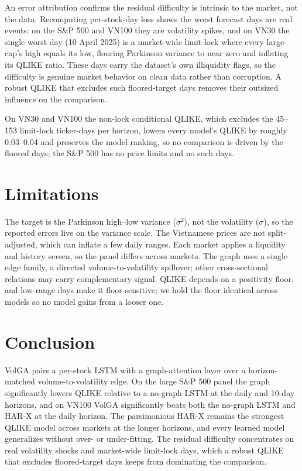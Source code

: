 \documentclass{llncs}
\begin{document}
An error attribution confirms the residual difficulty is intrinsic to the market, not the data. Recomputing
per-stock-day loss shows the worst forecast days are real events: on the S\&P 500 and VN100 they are volatility
spikes, and on VN30 the single worst day (10 April 2025) is a market-wide limit-lock where every large-cap's
high equals its low, flooring Parkinson variance to near zero and inflating its QLIKE ratio. These days carry
the dataset's own illiquidity flags, so the difficulty is genuine market behavior on clean data rather than
corruption. A robust QLIKE that excludes such floored-target days removes their outsized influence on the
comparison.


On VN30 and VN100 the non-lock conditional QLIKE, which excludes the 45--153 limit-lock ticker-days per horizon,
lowers every model's QLIKE by roughly 0.03--0.04 and preserves the model ranking, so no comparison is driven by
the floored days; the S\&P 500 has no price limits and no such days.

\section{Limitations}
The target is the Parkinson high--low variance ($\sigma^2$), not the volatility ($\sigma$), so the reported
errors live on the variance scale. The Vietnamese prices are not split-adjusted, which can inflate a few daily
ranges. Each market applies a liquidity and history screen, so the panel differs across markets. The graph uses
a single edge family, a directed volume-to-volatility spillover; other cross-sectional relations may carry
complementary signal. QLIKE depends on a positivity floor, and low-range days make it floor-sensitive; we hold
the floor identical across models so no model gains from a looser one.

\section{Conclusion}
VolGA pairs a per-stock LSTM with a graph-attention layer over a horizon-matched volume-to-volatility edge. On
the large S\&P 500 panel the graph significantly lowers QLIKE relative to a no-graph LSTM at the daily and
10-day horizons, and on VN100 VolGA significantly beats both the no-graph LSTM and HAR-X at the daily horizon.
The parsimonious HAR-X remains the strongest QLIKE model across markets at the longer horizons, and every
learned model generalizes without over- or under-fitting. The residual difficulty concentrates on real volatility shocks and market-wide
limit-lock days, which a robust QLIKE that excludes floored-target days keeps from dominating the comparison.



\end{document}
